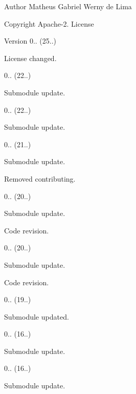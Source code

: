 \begin{DoxyAuthor}{Author}
Matheus Gabriel Werny de Lima 
\end{DoxyAuthor}
\begin{DoxyCopyright}{Copyright}
Apache-\/2. License 
\end{DoxyCopyright}
\begin{DoxyVersion}{Version}
0.. (25..)
\begin{DoxyItemize}
\item License changed. 
\end{DoxyItemize}

0.. (22..)
\begin{DoxyItemize}
\item Submodule update. 
\end{DoxyItemize}

0.. (22..)
\begin{DoxyItemize}
\item Submodule update. 
\end{DoxyItemize}

0.. (21..)
\begin{DoxyItemize}
\item Submodule update.
\item Removed contributing. 
\end{DoxyItemize}

0.. (20..)
\begin{DoxyItemize}
\item Submodule update.
\item Code revision. 
\end{DoxyItemize}

0.. (20..)
\begin{DoxyItemize}
\item Submodule update.
\item Code revision. 
\end{DoxyItemize}

0.. (19..)
\begin{DoxyItemize}
\item Submodule updated. 
\end{DoxyItemize}

0.. (16..)
\begin{DoxyItemize}
\item Submodule update. 
\end{DoxyItemize}

0.. (16..)
\begin{DoxyItemize}
\item Submodule update. 
\end{DoxyItemize}


\end{DoxyVersion}
